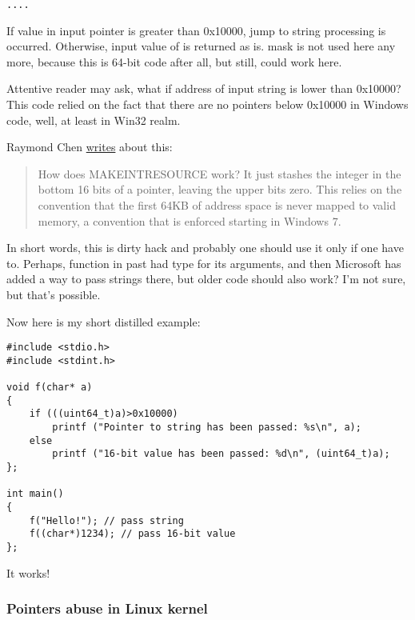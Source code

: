 \begin{lstlisting}
....

\end{lstlisting}

If value in input pointer is greater than 0x10000, jump to string processing is occurred.
Otherwise, input value of  is returned as is.
 mask is not used here any more, because this is 64-bit code after all, but still,  could work here.

Attentive reader may ask, what if address of input string is lower than 0x10000?
This code relied on the fact that there are no pointers below 0x10000 in Windows code, well, at least in Win32 realm.

Raymond Chen \href{https://blogs.msdn.microsoft.com/oldnewthing/20130925-00/?p=3123}{writes} about this:

\begin{framed}
\begin{quotation}
How does MAKE­INT­RESOURCE work? It just stashes the integer in the bottom 16 bits of a pointer, leaving the upper bits zero. This relies on the convention that the first 64KB of address space is never mapped to valid memory, a convention that is enforced starting in Windows 7.
\end{quotation}
\end{framed}

In short words, this is dirty hack and probably one should use it only if one have to.
Perhaps,  function in past had  type for its arguments, and then Microsoft has added a way to pass strings there,
but older code should also work? I'm not sure, but that's possible.

Now here is my short distilled example:

\begin{lstlisting}
#include <stdio.h>
#include <stdint.h>

void f(char* a)
{
	if (((uint64_t)a)>0x10000)
		printf ("Pointer to string has been passed: %s\n", a);
	else
		printf ("16-bit value has been passed: %d\n", (uint64_t)a);
};

int main()
{
	f("Hello!"); // pass string
	f((char*)1234); // pass 16-bit value
};
\end{lstlisting}

It works!

\subsubsection{Pointers abuse in Linux kernel}

